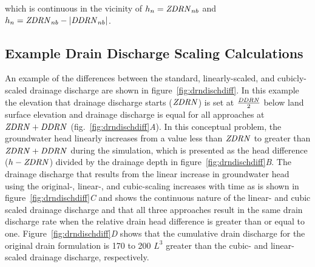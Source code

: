 \noindent which is continuous in the vicinity of $h_n = \mathit{ZDRN}_{nb}$ and $h_n = \mathit{ZDRN}_{nb} - \left| \mathit{DDRN}_{nb} \right| $.

\subsection{Example Drain Discharge Scaling Calculations}

An example of the differences between the standard, linearly-scaled, and cubicly-scaled drainage discharge are shown in figure~\ref{fig:drndischdiff}. In this example the elevation that drainage discharge starts ($\mathit{ZDRN}$) is set at $\frac{\mathit{DDRN}}{2}$ below land surface elevation and drainage discharge is equal for all approaches at $\mathit{ZDRN} + \mathit{DDRN}$ (fig.~\ref{fig:drndischdiff}\textit{A}). In this conceptual problem, the groundwater head linearly increases from a value less than $\mathit{ZDRN}$ to greater than $\mathit{ZDRN + DDRN}$ during the simulation, which is presented as the head difference ($h - \mathit{ZDRN}$) divided by the drainage depth in figure~\ref{fig:drndischdiff}\textit{B}. The drainage discharge that results from the linear increase in groundwater head using the original-, linear-, and cubic-scaling increases with time as is shown in figure~\ref{fig:drndischdiff}\textit{C} and shows the continuous nature of the linear- and cubic scaled drainage discharge and that all three approaches result in the same drain discharge rate when the relative drain head difference is greater than or equal to one. Figure~\ref{fig:drndischdiff}\textit{D} shows that the cumulative drain discharge for the original drain formulation is 170 to 200 $L^3$ greater than the cubic- and linear-scaled drainage discharge, respectively.

